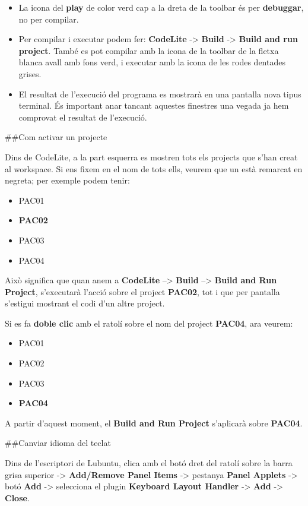 \documentclass[]{book}
\providecommand{\tightlist}{%
  \setlength{\itemsep}{0pt}\setlength{\parskip}{0pt}}
\begin{document}
\begin{itemize}
\item
  La icona del \textbf{play} de color verd cap a la dreta de la toolbar és per \textbf{debuggar}, no per compilar.
\item
  Per compilar i executar podem fer: \textbf{CodeLite} -\textgreater{} \textbf{Build} -\textgreater{} \textbf{Build and run project}. També es pot compilar amb la icona de la toolbar de la fletxa blanca avall amb fons verd, i executar amb la icona de les rodes dentades grises.
\item
  El resultat de l'execució del programa es mostrarà en una pantalla nova tipus terminal. És important anar tancant aquestes finestres una vegada ja hem comprovat el resultat de l'execució.
\end{itemize}

\#\#Com activar un projecte

Dins de CodeLite, a la part esquerra es mostren tots els projects que s'han creat al workspace. Si ens fixem en el nom de tots ells, veurem que un està remarcat en negreta; per exemple podem tenir:

\begin{itemize}
\tightlist
\item
  PAC01
\item
  \textbf{PAC02}
\item
  PAC03
\item
  PAC04
\end{itemize}

Això significa que quan anem a \textbf{CodeLite} --\textgreater{} \textbf{Build} --\textgreater{} \textbf{Build and Run Project}, s'executarà l'acció sobre el project \textbf{PAC02}, tot i que per pantalla s'estigui mostrant el codi d'un altre project.

Si es fa \textbf{doble clic} amb el ratolí sobre el nom del project \textbf{PAC04}, ara veurem:

\begin{itemize}
\tightlist
\item
  PAC01
\item
  PAC02
\item
  PAC03
\item
  \textbf{PAC04}
\end{itemize}

A partir d'aquest moment, el \textbf{Build and Run Project} s'aplicarà sobre \textbf{PAC04}.

\#\#Canviar idioma del teclat

Dins de l'escriptori de Lubuntu, clica amb el botó dret del ratolí sobre la barra grisa superior -\textgreater{} \textbf{Add/Remove Panel Items} -\textgreater{} pestanya \textbf{Panel Applets} -\textgreater{} botó \textbf{Add} -\textgreater{} selecciona el plugin \textbf{Keyboard Layout Handler} -\textgreater{} \textbf{Add} -\textgreater{} \textbf{Close}.
\end{document}
